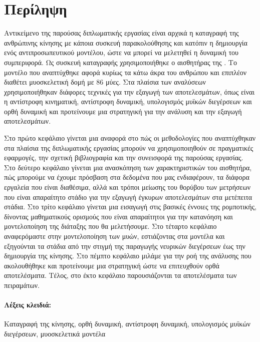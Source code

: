 \section*{Περίληψη}

Αντικείμενο της παρούσας διπλωματικής εργασίας είναι αρχικά η καταγραφή της ανθρώπινης κίνησης με κάποια συσκευή παρακολούθησης και κατόπιν η δημιουργία ενός αντιπροσωπευτικού μοντέλου, ώστε να μπορεί να μελετηθεί η δυναμική του συμπεριφορά. Ως συσκευή καταγραφής χρησιμοποιήθηκε ο αισθητήρας  της . Το μοντέλο που αναπτύχθηκε αφορά κυρίως τα κάτω άκρα του ανθρώπου και επιπλέον διαθέτει μυοσκελετική δομή με 86 μύες. Στα πλαίσια των αναλύσεων χρησιμοποιήθηκαν διάφορες τεχνικές για την εξαγωγή των αποτελεσμάτων, όπως είναι η αντίστροφη κινηματική, αντίστροφη δυναμική, υπολογισμός μυϊκών διεγέρσεων και ορθή δυναμική και προτείνουμε μια στρατηγική για την ανάλυση και την εξαγωγή αποτελεσμάτων.

Στο πρώτο κεφάλαιο γίνεται μια αναφορά στο πώς οι μεθοδολογίες που αναπτύχθηκαν στα πλαίσια της διπλωματικής εργασίας μπορούν να χρησιμοποιηθούν σε πραγματικές εφαρμογές, την σχετική βιβλιογραφία και την συνεισφορά της παρούσας εργασίας. Στο δεύτερο κεφάλαιο γίνεται μια ανασκόπηση των χαρακτηριστικών του αισθητήρα, πώς μπορούμε να έχουμε πρόσβαση στα δεδομένα που μας ενδιαφέρουν, τα διάφορα εργαλεία που είναι διαθέσιμα, αλλά και τρόποι μείωσης του θορύβου των μετρήσεων που είναι απαραίτητο στάδιο για την εξαγωγή έγκυρων αποτελεσμάτων στα μετέπειτα στάδια. Στο τρίτο κεφάλαιο γίνεται μια εισαγωγή στις βασικές έννοιες της ρομποτικής, δίνοντας μαθηματικούς ορισμούς που είναι απαραίτητοι για την κατανόηση και μοντελοποίηση της διάταξης που θα μελετήσουμε. Στο τέταρτο κεφάλαιο αναφερόμαστε στην μοντελοποίηση των μυών, εστιάζοντας στα μοντέλα  και εξηγούνται τα στάδια από την στιγμή της παραγωγής νευρικών διεγέρσεων έως την δημιουργία της κίνησης. Στο πέμπτο κεφάλαιο μιλάμε για την ροή της ανάλυσης που ακολουθήθηκε και προτείνουμε μια στρατηγική ώστε να επιτευχθούν ορθά αποτελέσματα. Τέλος, στο έκτο κεφάλαιο παρουσιάζονται τα αποτελέσματα των πειραμάτων.

\vfill

\paragraph{\textbf{Λέξεις κλειδιά:}}Καταγραφή της κίνησης, ορθή δυναμική, αντίστροφη δυναμική, υπολογισμός μυϊκών διεγέρσεων, μυοσκελετικά μοντέλα

